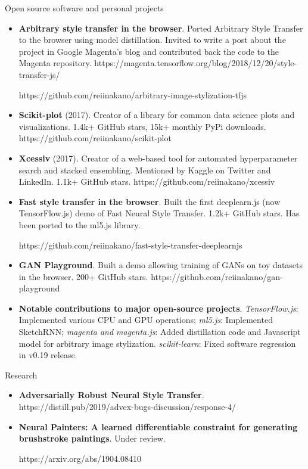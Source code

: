 \documentclass[]{mcdowellcv}
\begin{document}
	\begin{cvsection}{Open source software and personal projects}
		\begin{cvsubsection}{}{}{}
			\begin{itemize}
			
			    \item \textbf{Arbitrary style transfer in the browser}. Ported Arbitrary Style Transfer to the browser using model distillation. Invited to write a post about the project in Google Magenta's blog and contributed back the code to the Magenta repository. https://magenta.tensorflow.org/blog/2018/12/20/style-transfer-js/
			    
			    https://github.com/reiinakano/arbitrary-image-stylization-tfjs 
			    \item \textbf{Scikit-plot} (2017). Creator of a library for common data science plots and visualizations. 1.4k+ GitHub stars, 15k+ monthly PyPi downloads. https://github.com/reiinakano/scikit-plot
				\item \textbf{Xcessiv} (2017). Creator of a web-based tool for automated hyperparameter search and stacked ensembling. Mentioned by Kaggle on Twitter and LinkedIn. 1.1k+ GitHub stars. https://github.com/reiinakano/xcessiv
				\item \textbf{Fast style transfer in the browser}. Built the first deeplearn.js (now TensorFlow.js) demo of Fast Neural Style Transfer. 1.2k+ GitHub stars. Has been ported to the ml5.js library. 
				
				https://github.com/reiinakano/fast-style-transfer-deeplearnjs
				\item \textbf{GAN Playground}. Built a demo allowing training of GANs on toy datasets in the browser. 200+ GitHub stars. https://github.com/reiinakano/gan-playground
				\item \textbf{Notable contributions to major open-source projects}. \textit{TensorFlow.js}: Implemented various CPU and GPU operations; \textit{ml5.js}: Implemented SketchRNN; \textit{magenta and magenta.js}: Added distillation code and Javascript model for arbitrary image stylization. \textit{scikit-learn}: Fixed software regression in v0.19 release.
			\end{itemize}
		\end{cvsubsection}
	\end{cvsection}
	
	\begin{cvsection}{Research}
	   \begin{cvsubsection}{}{}{}
	      \begin{itemize}
    		  \item \textbf{Adversarially Robust Neural Style Transfer}. https://distill.pub/2019/advex-bugs-discussion/response-4/
	          
	          \item \textbf{Neural Painters: A learned differentiable constraint for generating brushstroke paintings}. Under review.
	          
	          https://arxiv.org/abs/1904.08410
	      \end{itemize}
	   \end{cvsubsection}
	\end{cvsection}
	
\end{document}
